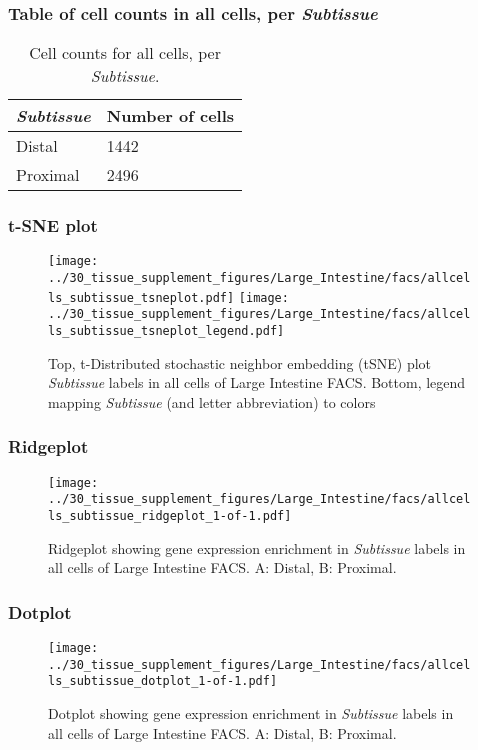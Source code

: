 \subsubsection{Table of cell counts in all cells, per \emph{Subtissue}}\begin{table}[h]
\centering
\label{my-label}
\begin{tabular}{@{}ll@{}}
\toprule

\emph{Subtissue}& Number of cells \\ \midrule
Distal & 1442 \\

Proximal & 2496 \\
\bottomrule
\end{tabular}
\caption{Cell counts for all cells, per \emph{Subtissue}.}
\end{table}

\clearpage
\subsubsection{t-SNE plot}
\begin{figure}[h]
\centering
\texttt{[image: ../30\_tissue\_supplement\_figures/Large\_Intestine/facs/allcells\_subtissue\_tsneplot.pdf]}
\texttt{[image: ../30\_tissue\_supplement\_figures/Large\_Intestine/facs/allcells\_subtissue\_tsneplot\_legend.pdf]}
\caption{Top, t-Distributed stochastic neighbor embedding (tSNE) plot  \emph{Subtissue} labels in all cells of Large Intestine FACS. Bottom, legend mapping \emph{Subtissue} (and letter abbreviation) to colors}
\end{figure}


\clearpage

\subsubsection{Ridgeplot}
\begin{figure}[h]
\centering
\texttt{[image: ../30\_tissue\_supplement\_figures/Large\_Intestine/facs/allcells\_subtissue\_ridgeplot\_1-of-1.pdf]}

\caption{ Ridgeplot  showing gene expression enrichment in \emph{Subtissue} labels in all cells of Large Intestine FACS. A: Distal, B: Proximal.}
\end{figure}


\clearpage

\subsubsection{Dotplot}
\begin{figure}[h]
\centering
\texttt{[image: ../30\_tissue\_supplement\_figures/Large\_Intestine/facs/allcells\_subtissue\_dotplot\_1-of-1.pdf]}

\caption{ Dotplot  showing gene expression enrichment in \emph{Subtissue} labels in all cells of Large Intestine FACS. A: Distal, B: Proximal.}
\end{figure}

